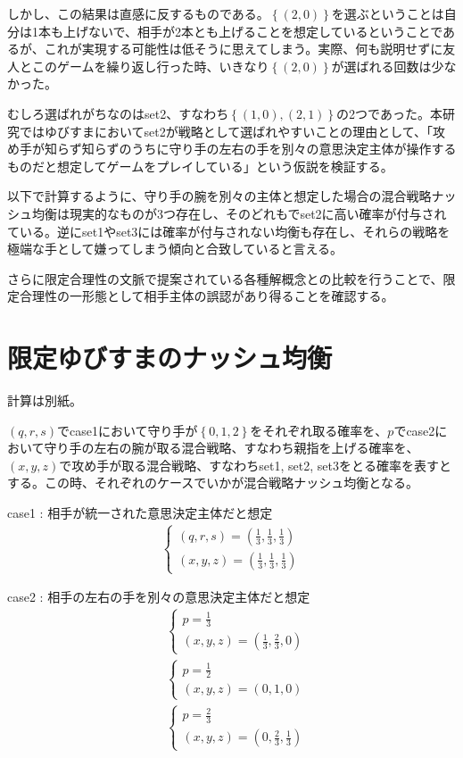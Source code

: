 \documentclass{jsarticle}
\begin{document}
しかし、この結果は直感に反するものである。$\left\{ (2,0)\right\}$を選ぶということは自分は1本も上げないで、相手が2本とも上げることを想定しているということであるが、これが実現する可能性は低そうに思えてしまう。実際、何も説明せずに友人とこのゲームを繰り返し行った時、いきなり$\left\{ (2,0)\right\}$が選ばれる回数は少なかった。

むしろ選ばれがちなのはset2、すなわち$\left\{ (1,0), (2,1)\right\}$の2つであった。本研究ではゆびすまにおいてset2が戦略として選ばれやすいことの理由として、「攻め手が知らず知らずのうちに守り手の左右の手を別々の意思決定主体が操作するものだと想定してゲームをプレイしている」という仮説を検証する。

以下で計算するように、守り手の腕を別々の主体と想定した場合の混合戦略ナッシュ均衡は現実的なものが3つ存在し、そのどれもでset2に高い確率が付与されている。逆にset1やset3には確率が付与されない均衡も存在し、それらの戦略を極端な手として嫌ってしまう傾向と合致していると言える。

さらに限定合理性の文脈で提案されている各種解概念との比較を行うことで、限定合理性の一形態として相手主体の誤認があり得ることを確認する。

\section{限定ゆびすまのナッシュ均衡}
計算は別紙。

$(q, r, s)$でcase1において守り手が$\left\{ 0,1,2\right\}$をそれぞれ取る確率を、$p$でcase2において守り手の左右の腕が取る混合戦略、すなわち親指を上げる確率を、$(x, y, z)$で攻め手が取る混合戦略、すなわちset1, set2, set3をとる確率を表すとする。この時、それぞれのケースでいかが混合戦略ナッシュ均衡となる。

\begin{itembox}[l]{case1 : 相手が統一された意思決定主体だと想定}
    \begin{align}
    	\begin{cases}
		(q, r, s) = (\frac{1}{3}, \frac{1}{3}, \frac{1}{3})\\
		(x, y, z) = (\frac{1}{3}, \frac{1}{3}, \frac{1}{3})
	\end{cases}
    \end{align}
\end{itembox}

\begin{itembox}[l]{case2 : 相手の左右の手を別々の意思決定主体だと想定}
\begin{align}
    	&\begin{cases}
		p = \frac{1}{3}\\
		(x, y, z) = (\frac{1}{3}, \frac{2}{3}, 0)
	\end{cases}\\[10pt]
	&\begin{cases}
		p = \frac{1}{2}\\
		(x, y, z) = (0, 1, 0)
	\end{cases}\\[10pt]
	&\begin{cases}
		p = \frac{2}{3}\\
		(x, y, z) = (0, \frac{2}{3}, \frac{1}{3})
	\end{cases}
\end{align}
\end{itembox}
\end{document}
